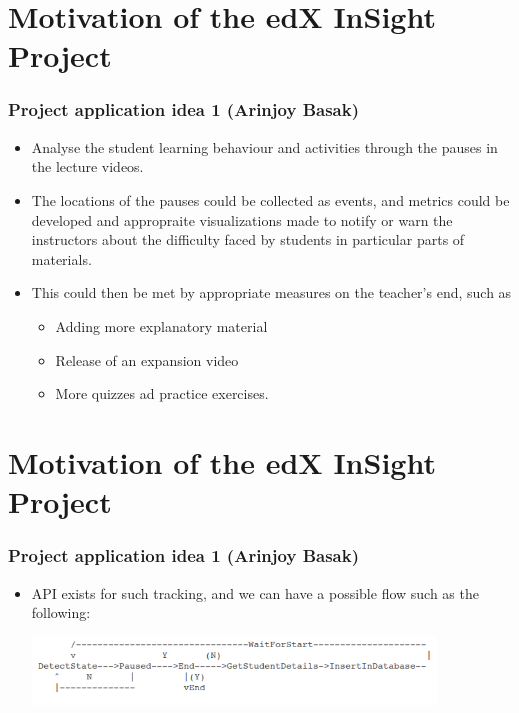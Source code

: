 \documentclass[12pt,xcolor=dvipsnames]{beamer}
\begin{document}
\section{Motivation of the edX InSight Project}
\begin{frame}[t]
\frametitle{Project application idea 1 (Arinjoy Basak)}

\begin{itemize}
\item Analyse the student learning behaviour and activities through the pauses in the lecture videos.
\item The locations of the pauses could be collected as events, and metrics could be developed and appropraite visualizations made to notify or warn the instructors about the difficulty faced by students in particular parts of materials.
\item This could then be met by appropriate measures on the teacher's end, such as

\begin{itemize}
\item Adding more explanatory material
\item Release of an expansion video
\item More quizzes ad practice exercises.
\end{itemize}

\end{itemize}
\end{frame}

\section{Motivation of the edX InSight Project}
\begin{frame}[t]
\frametitle{Project application idea 1 (Arinjoy Basak)}
\hfill
\hfill
\begin{itemize}
\item API exists for such tracking, and we can have a possible flow such as the following:
\hfill
\begin{center}
\includegraphics[height=1.8cm]{Diag1.png}\\ %
\end{center}

\end{itemize}

\end{frame}
\end{document}
